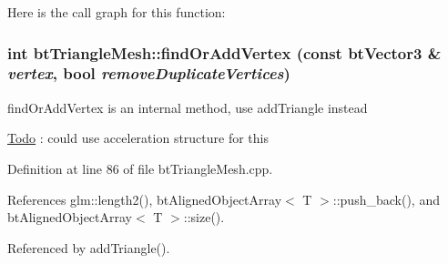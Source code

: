 Here is the call graph for this function:\hypertarget{classbt_triangle_mesh_3b521a1faa5862a818d9f983230749a2}{
\subsubsection[findOrAddVertex]{\setlength{\rightskip}{0pt plus 5cm}int btTriangleMesh::findOrAddVertex (const btVector3 \& {\em vertex}, \/  bool {\em removeDuplicateVertices})}}
\label{classbt_triangle_mesh_3b521a1faa5862a818d9f983230749a2}


findOrAddVertex is an internal method, use addTriangle instead 



\begin{Desc}
\item[\hyperlink{todo__todo000024}{Todo}]: could use acceleration structure for this \end{Desc}


Definition at line 86 of file btTriangleMesh.cpp.

References glm::length2(), btAlignedObjectArray$<$ T $>$::push\_\-back(), and btAlignedObjectArray$<$ T $>$::size().

Referenced by addTriangle().

